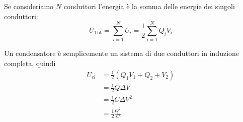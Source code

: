 \documentclass[a4paper]{article}
\begin{document}
\vspace{1em}
\noindent
Se consideriamo \( N \) conduttori l'energia è la somma delle energie dei singoli
conduttori:
\[
  U_{\text{Tot}} = \sum_{i=1}^N U_i = \frac{1}{2} \sum_{i=1}^N Q_i V_i
\] 

\vspace{1em}
\noindent
Un condensatore è semplicemente un sistema di due conduttori in induzione completa, quindi
\[
  \begin{aligned}
    U_{el} &= \frac{1}{2} (Q_1 V_1 + Q_2 + V_2)\\
    &= \frac{1}{2} Q \Delta V \\
    &= \frac{1}{2} C \Delta V^2 \\
    &= \frac{1}{2} \frac{Q^2}{C} \
  \end{aligned}
\] 
\end{document}
